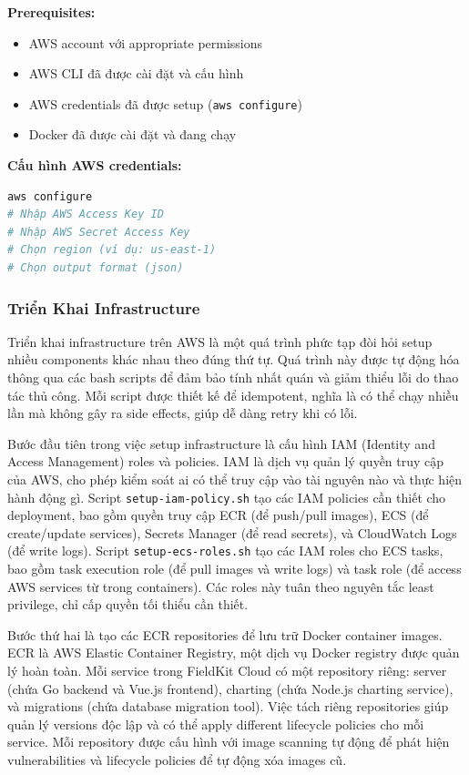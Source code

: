\textbf{Prerequisites:}
\begin{itemize}
    \item AWS account với appropriate permissions
    \item AWS CLI đã được cài đặt và cấu hình
    \item AWS credentials đã được setup (\texttt{aws configure})
    \item Docker đã được cài đặt và đang chạy
\end{itemize}

\textbf{Cấu hình AWS credentials:}
\begin{lstlisting}[language=bash, caption=Cấu hình AWS]
aws configure
# Nhập AWS Access Key ID
# Nhập AWS Secret Access Key
# Chọn region (ví dụ: us-east-1)
# Chọn output format (json)
\end{lstlisting}

\subsubsection{Triển Khai Infrastructure}

Triển khai infrastructure trên AWS là một quá trình phức tạp đòi hỏi setup nhiều components khác nhau theo đúng thứ tự. Quá trình này được tự động hóa thông qua các bash scripts để đảm bảo tính nhất quán và giảm thiểu lỗi do thao tác thủ công. Mỗi script được thiết kế để idempotent, nghĩa là có thể chạy nhiều lần mà không gây ra side effects, giúp dễ dàng retry khi có lỗi.

Bước đầu tiên trong việc setup infrastructure là cấu hình IAM (Identity and Access Management) roles và policies. IAM là dịch vụ quản lý quyền truy cập của AWS, cho phép kiểm soát ai có thể truy cập vào tài nguyên nào và thực hiện hành động gì. Script \texttt{setup-iam-policy.sh} tạo các IAM policies cần thiết cho deployment, bao gồm quyền truy cập ECR (để push/pull images), ECS (để create/update services), Secrets Manager (để read secrets), và CloudWatch Logs (để write logs). Script \texttt{setup-ecs-roles.sh} tạo các IAM roles cho ECS tasks, bao gồm task execution role (để pull images và write logs) và task role (để access AWS services từ trong containers). Các roles này tuân theo nguyên tắc least privilege, chỉ cấp quyền tối thiểu cần thiết.

Bước thứ hai là tạo các ECR repositories để lưu trữ Docker container images. ECR là AWS Elastic Container Registry, một dịch vụ Docker registry được quản lý hoàn toàn. Mỗi service trong FieldKit Cloud có một repository riêng: server (chứa Go backend và Vue.js frontend), charting (chứa Node.js charting service), và migrations (chứa database migration tool). Việc tách riêng repositories giúp quản lý versions độc lập và có thể apply different lifecycle policies cho mỗi service. Mỗi repository được cấu hình với image scanning tự động để phát hiện vulnerabilities và lifecycle policies để tự động xóa images cũ.


